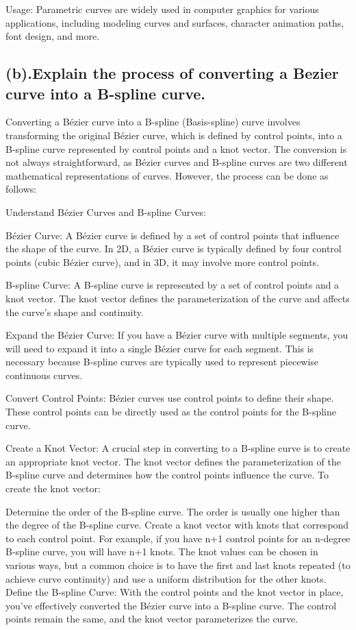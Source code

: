 \documentclass{article}
\begin{document}
\begin{itemize}
Usage: Parametric curves are widely used in computer graphics for various applications, including modeling curves and surfaces, character animation paths, font design, and more.
\subsection{(b).Explain the process of converting a Bezier curve into a B-spline curve.}
Converting a Bézier curve into a B-spline (Basis-spline) curve involves transforming the original Bézier curve, which is defined by control points, into a B-spline curve represented by control points and a knot vector. The conversion is not always straightforward, as Bézier curves and B-spline curves are two different mathematical representations of curves. However, the process can be done as follows:

Understand Bézier Curves and B-spline Curves:

Bézier Curve: A Bézier curve is defined by a set of control points that influence the shape of the curve. In 2D, a Bézier curve is typically defined by four control points (cubic Bézier curve), and in 3D, it may involve more control points.

B-spline Curve: A B-spline curve is represented by a set of control points and a knot vector. The knot vector defines the parameterization of the curve and affects the curve's shape and continuity.

Expand the Bézier Curve:
If you have a Bézier curve with multiple segments, you will need to expand it into a single Bézier curve for each segment. This is necessary because B-spline curves are typically used to represent piecewise continuous curves.

Convert Control Points:
Bézier curves use control points to define their shape. These control points can be directly used as the control points for the B-spline curve.

Create a Knot Vector:
A crucial step in converting to a B-spline curve is to create an appropriate knot vector. The knot vector defines the parameterization of the B-spline curve and determines how the control points influence the curve. To create the knot vector:

Determine the order of the B-spline curve. The order is usually one higher than the degree of the B-spline curve.
Create a knot vector with knots that correspond to each control point. For example, if you have n+1 control points for an n-degree B-spline curve, you will have n+1 knots. The knot values can be chosen in various ways, but a common choice is to have the first and last knots repeated (to achieve curve continuity) and use a uniform distribution for the other knots.
Define the B-spline Curve:
With the control points and the knot vector in place, you've effectively converted the Bézier curve into a B-spline curve. The control points remain the same, and the knot vector parameterizes the curve.


\end{itemize}
\end{document}

